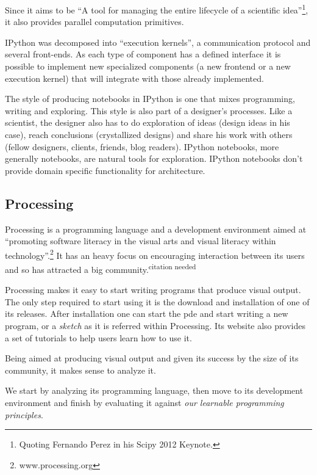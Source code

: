 \documentclass{./llncs2e/llncs}
\begin{document}
	Since it aims to be ``A tool for managing the entire lifecycle of a scientific idea''\footnote{Quoting Fernando Perez in his Scipy 2012 Keynote.}, it also provides parallel computation primitives.

	IPython was decomposed into ``execution kernels'', a communication protocol and several front-ends. 
	As each type of component has a defined interface it is possible to implement new specialized components (a new frontend or a new execution kernel) that will integrate with those already implemented.

	The style of producing notebooks in IPython is one that mixes programming, writing and exploring. 
	This style is also part of a designer's processes. 
	Like a scientist, the designer also has to do exploration of ideas (design ideas in his case), reach conclusions (crystallized designs) and share his work with others (fellow designers, clients, friends, blog readers). 
	IPython notebooks, more generally notebooks, are natural tools for exploration.
	IPython notebooks don't provide domain specific functionality for architecture.

\subsection{Processing\cite{reas2007processing}}
	Processing is a programming language and a development environment aimed at ``promoting software literacy in the visual arts and visual literacy within technology''.\footnote{www.processing.org} 
	It has an heavy focus on encouraging interaction between its users and so has attracted a big community.\textsuperscript{citation needed}

	Processing makes it easy to start writing programs that produce visual output. 
	The only step required to start using it is the download and installation of one of its releases. 
	After installation one can start the \ac{pde} and start writing a new program, or a \emph{sketch} as it is referred within Processing. 
	Its website also provides a set of tutorials to help users learn how to use it.

	Being aimed at producing visual output and given its success by the size of its community, it makes sense to analyze it.

	We start by analyzing its programming language, then move to its development environment and finish by evaluating it against \emph{our learnable programming principles}.
\end{document}
